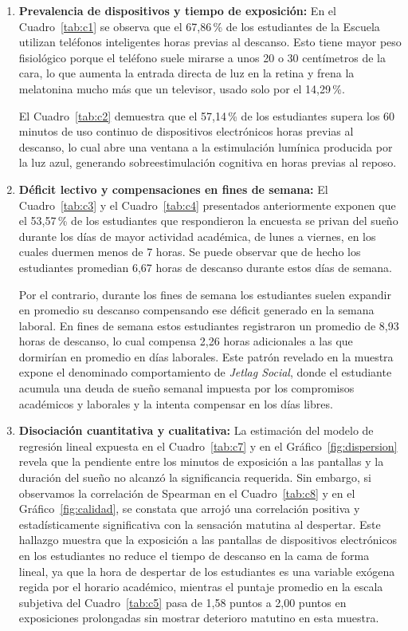 \documentclass[12pt, letterpaper]{article}
\begin{document}
\begin{enumerate}
    \item \textbf{Prevalencia de dispositivos y tiempo de exposición:}
    En el Cuadro~\ref{tab:c1} se observa que el 67,86\,\% de los estudiantes de la Escuela utilizan teléfonos inteligentes horas previas al descanso. Esto tiene mayor peso fisiológico porque el teléfono suele mirarse a unos 20 o 30 centímetros de la cara, lo que aumenta la entrada directa de luz en la retina y frena la melatonina mucho más que un televisor, usado solo por el 14,29\,\%.

    El Cuadro~\ref{tab:c2} demuestra que el 57,14\,\% de los estudiantes supera los 60 minutos de uso continuo de dispositivos electrónicos horas previas al descanso, lo cual abre una ventana a la estimulación lumínica producida por la luz azul, generando sobreestimulación cognitiva en horas previas al reposo.

    \item \textbf{Déficit lectivo y compensaciones en fines de semana:}
    El Cuadro~\ref{tab:c3} y el Cuadro~\ref{tab:c4} presentados anteriormente exponen que el 53,57\,\% de los estudiantes que respondieron la encuesta se privan del sueño durante los días de mayor actividad académica, de lunes a viernes, en los cuales duermen menos de 7 horas. Se puede observar que de hecho los estudiantes promedian 6,67 horas de descanso durante estos días de semana.

    Por el contrario, durante los fines de semana los estudiantes suelen expandir en promedio su descanso compensando ese déficit generado en la semana laboral. En fines de semana estos estudiantes registraron un promedio de 8,93 horas de descanso, lo cual compensa 2,26 horas adicionales a las que dormirían en promedio en días laborales. Este patrón revelado en la muestra expone el denominado comportamiento de \textit{Jetlag Social}, donde el estudiante acumula una deuda de sueño semanal impuesta por los compromisos académicos y laborales y la intenta compensar en los días libres.

    \item \textbf{Disociación cuantitativa y cualitativa:}
    La estimación del modelo de regresión lineal expuesta en el Cuadro~\ref{tab:c7} y en el Gráfico~\ref{fig:dispersion} revela que la pendiente entre los minutos de exposición a las pantallas y la duración del sueño no alcanzó la significancia requerida. Sin embargo, si observamos la correlación de Spearman en el Cuadro~\ref{tab:c8} y en el Gráfico~\ref{fig:calidad}, se constata que arrojó una correlación positiva y estadísticamente significativa con la sensación matutina al despertar. Este hallazgo muestra que la exposición a las pantallas de dispositivos electrónicos en los estudiantes no reduce el tiempo de descanso en la cama de forma lineal, ya que la hora de despertar de los estudiantes es una variable exógena regida por el horario académico, mientras el puntaje promedio en la escala subjetiva del Cuadro~\ref{tab:c5} pasa de 1,58 puntos a 2,00 puntos en exposiciones prolongadas sin mostrar deterioro matutino en esta muestra.
\end{enumerate}
\end{document}
